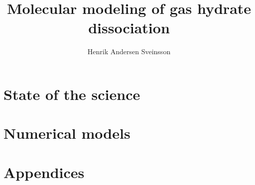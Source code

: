 \documentclass[twoside, english, a4paper, 11pt]{../utils/uiofysmaster/uiofysmaster}
\title{Molecular modeling of gas hydrate dissociation}
\author{Henrik Andersen Sveinsson}
\begin{document}
\maketitle




\tableofcontents



\part{State of the science}



\part{Numerical models}




\part{Appendices}
\appendix





\end{document}
